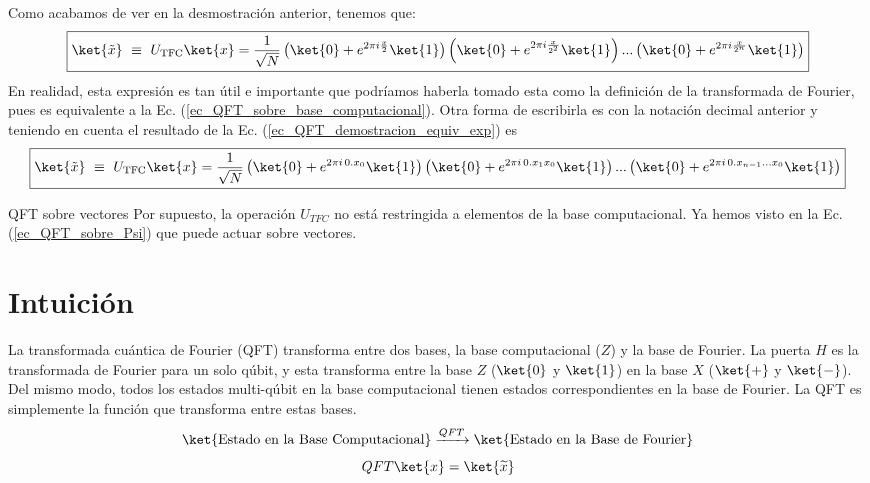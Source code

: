 \documentclass[a4paper,11pt]{book} %
\numberwithin{equation}{chapter}
\begin{document}
Como acabamos de ver en la desmostración anterior, tenemos que:
	\begin{equation} \label{ec_QFT_ecuacion_desarrollada}
\boxed{\ket{\tilde x}  ~\equiv ~  U_{\rm TFC}\ket{x} = \frac{1}{\sqrt{N}} \left( \ket{0} + e^{2\pi i \frac{x}{2}}\ket{1}\right)\left( \ket{0} + e^{2\pi i \frac{x}{2^2}}\ket{1}\right)...\left( \ket{0} + e^{2\pi i \frac{x}{2^n}}\ket{1}\right)}
	\end{equation}
En realidad, esta expresión es tan útil e importante que podríamos haberla tomado esta como la definición de la transformada de Fourier, pues es equivalente a la Ec. (\ref{ec_QFT_sobre_base_computacional}). Otra forma de escribirla es con la notación decimal anterior y teniendo en cuenta el resultado de la Ec. (\ref{ec_QFT_demostracion_equiv_exp}) es 
	\begin{equation}
	\boxed{\ket{\tilde x}  ~\equiv ~  U_{\rm TFC}\ket{x} = \frac{1}{\sqrt{N}} \left( \ket{0} + e^{2\pi i \, 0.x_0}\ket{1}\right)\left( \ket{0} + e^{2\pi i \, 0.x_1x_0}\ket{1}\right)...\left( \ket{0} + e^{2\pi i \, 0.x_{n-1}...x_0}\ket{1}\right) }
	\end{equation}



	

	\begin{mybox_blue}{QFT sobre vectores}
	Por supuesto, la operación $U_{TFC}$ no está restringida a elementos de la base computacional. Ya hemos visto en la Ec. (\ref{ec_QFT_sobre_Psi}) que puede actuar sobre vectores.
	\end{mybox_blue}



	\section{Intuición}


La transformada cuántica de Fourier (QFT) transforma entre dos bases, la base computacional ($Z$) y la base de Fourier. La puerta $H$ es la transformada de Fourier para un solo qúbit, y esta transforma entre la base $Z$ ($\ket{0}$ y $\ket{1}$) en la base $X$ ($\ket{+}$ y $\ket{-}$). Del mismo modo, todos los estados multi-qúbit en la base computacional tienen estados correspondientes en la base de Fourier. La QFT es simplemente la función que transforma entre estas bases.
	\begin{equation*}
	\ket{\text{Estado en la Base Computacional}} \xrightarrow{QFT} \ket{\text{Estado en la Base de Fourier}}
 	\end{equation*}
	\begin{equation*}
	QFT \ket{x} = \ket{\widetilde{x}}
	\end{equation*}
\end{document}
